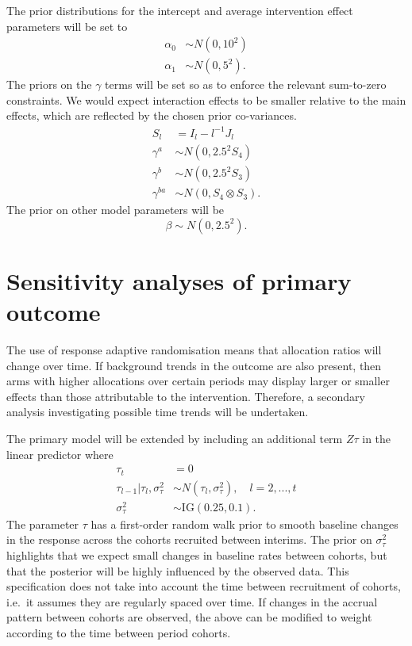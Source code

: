 \documentclass[
  bibliography=totoc]{scrreprt}
\begin{document}
The prior distributions for the intercept and average intervention effect parameters will be set to
\[
\begin{aligned}
\alpha_0 &\sim N(0, 10^2) \\
\alpha_1 &\sim N(0, 5^2).
\end{aligned}
\]
The priors on the \(\gamma\) terms will be set so as to enforce the relevant sum-to-zero constraints.
We would expect interaction effects to be smaller relative to the main effects, which are reflected by the chosen prior co-variances.
\[
\begin{aligned}
S_l &= I_l - l^{-1}J_l \\
\gamma^a &\sim N(0, 2.5^2S_4) \\
\gamma^b &\sim N(0, 2.5^2S_3) \\
\gamma^{ba} &\sim N(0, S_4\otimes S_3).
\end{aligned}
\]
The prior on other model parameters will be
\[
\beta \sim N(0, 2.5^2).
\]

\hypertarget{sensitivity-analyses-of-primary-outcome}{%
\section{Sensitivity analyses of primary outcome}\label{sensitivity-analyses-of-primary-outcome}}

The use of response adaptive randomisation means that allocation ratios will change over time.
If background trends in the outcome are also present, then arms with higher allocations over certain periods may display larger or smaller effects than those attributable to the intervention.
Therefore, a secondary analysis investigating possible time trends will be undertaken.

The primary model will be extended by including an additional term \(Z\tau\) in the linear predictor where
\[
\begin{aligned}
\tau_t &= 0 \\
\tau_{l-1}|\tau_l,\sigma_\tau^2 &\sim N(\tau_l,\sigma_\tau^2),\quad l=2,...,t \\
\sigma_\tau^2 &\sim \text{IG}(0.25, 0.1).
\end{aligned}
\]
The parameter \(\tau\) has a first-order random walk prior to smooth baseline changes in the response across the cohorts recruited between interims.
The prior on \(\sigma_\tau^2\) highlights that we expect small changes in baseline rates between cohorts, but that the posterior will be highly influenced by the observed data.
This specification does not take into account the time between recruitment of cohorts, i.e.~it assumes they are regularly spaced over time.
If changes in the accrual pattern between cohorts are observed, the above can be modified to weight according to the time between period cohorts.
\end{document}
